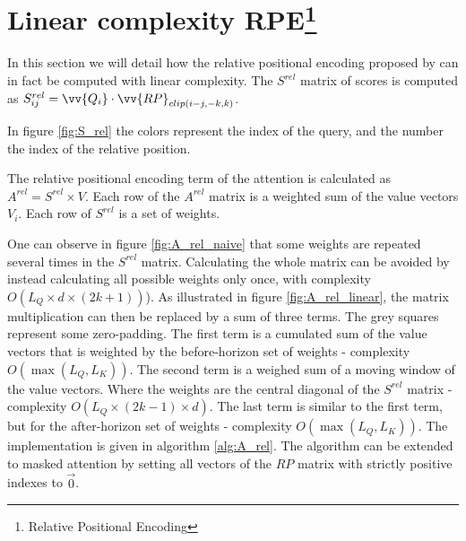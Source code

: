 \section{Linear complexity RPE\protect\footnote{Relative Positional Encoding}}

In this section we will detail how the relative positional encoding
 proposed by \citet{shaw2018selfattention}
can in fact be computed with linear complexity. The $S^{rel}$ matrix of scores is computed as
$S^{rel}_{ij} = \vv{Q_i} \cdot \vv{RP}_{clip(i-j, -k, k)}$.

In figure \ref{fig:S_rel} the colors represent the index of the query, and the number the
index of the relative position.

The relative positional encoding term of the attention is calculated as $A^{rel} = S^{rel} \times V$. Each row of the $A^{rel}$ matrix is a weighted sum of the value vectors $V_i$. Each row of $S^{rel}$ is a set of weights.

One can observe in figure \ref{fig:A_rel_naive} that some weights are repeated several times in the
$S^{rel}$ matrix. Calculating the whole matrix can be avoided by
instead calculating all possible weights only once, with complexity
$O \left(L_Q\times d\times(2k+1)\right)$). As illustrated in figure \ref{fig:A_rel_linear}, the matrix multiplication can then be replaced by a sum of three terms. The grey squares represent some zero-padding. The first term is a cumulated sum of the value vectors that is weighted  by the before-horizon set of weights - complexity $O(\max(L_Q, L_K))$. The second term is a weighed sum of a moving window of the value vectors. Where the weights are the central diagonal of the $S^{rel}$ matrix - complexity $O(L_Q \times (2k-1) \times d)$. The last term is similar to the first term, but for the after-horizon set of weights  - complexity $O(\max(L_Q, L_K))$. The implementation is given in algorithm \ref{alg:A_rel}. The algorithm can be extended to masked attention by setting all vectors of the $RP$ matrix with strictly positive indexes to $\vec{0}$.

\endinput
